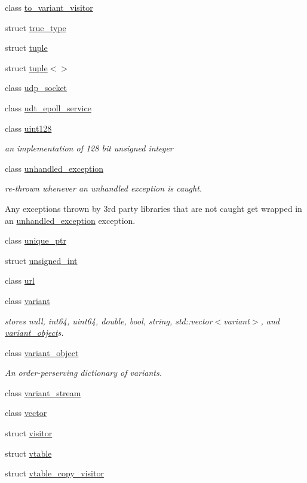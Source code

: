 \begin{DoxyCompactItemize}
\item 
class \mbox{\hyperlink{classfc_1_1to__variant__visitor}{to\+\_\+variant\+\_\+visitor}}
\item 
struct \mbox{\hyperlink{structfc_1_1true__type}{true\+\_\+type}}
\item 
struct \mbox{\hyperlink{structfc_1_1tuple}{tuple}}
\item 
struct \mbox{\hyperlink{structfc_1_1tuple_3_4}{tuple$<$$>$}}
\item 
class \mbox{\hyperlink{classfc_1_1udp__socket}{udp\+\_\+socket}}
\item 
class \mbox{\hyperlink{classfc_1_1udt__epoll__service}{udt\+\_\+epoll\+\_\+service}}
\item 
class \mbox{\hyperlink{classfc_1_1uint128}{uint128}}
\begin{DoxyCompactList}\small\item\em an implementation of 128 bit unsigned integer \end{DoxyCompactList}\item 
class \mbox{\hyperlink{classfc_1_1unhandled__exception}{unhandled\+\_\+exception}}
\begin{DoxyCompactList}\small\item\em re-\/thrown whenever an unhandled exception is caught.

Any exceptions thrown by 3rd party libraries that are not caught get wrapped in an \mbox{\hyperlink{classfc_1_1unhandled__exception}{unhandled\+\_\+exception}} exception. \end{DoxyCompactList}\item 
class \mbox{\hyperlink{classfc_1_1unique__ptr}{unique\+\_\+ptr}}
\item 
struct \mbox{\hyperlink{structfc_1_1unsigned__int}{unsigned\+\_\+int}}
\item 
class \mbox{\hyperlink{classfc_1_1url}{url}}
\item 
class \mbox{\hyperlink{classfc_1_1variant}{variant}}
\begin{DoxyCompactList}\small\item\em stores null, int64, uint64, double, bool, string, std\+::vector$<$variant$>$, and \mbox{\hyperlink{classfc_1_1variant__object}{variant\+\_\+object}}\textquotesingle{}s. \end{DoxyCompactList}\item 
class \mbox{\hyperlink{classfc_1_1variant__object}{variant\+\_\+object}}
\begin{DoxyCompactList}\small\item\em An order-\/perserving dictionary of variant\textquotesingle{}s. \end{DoxyCompactList}\item 
class \mbox{\hyperlink{classfc_1_1variant__stream}{variant\+\_\+stream}}
\item 
class \mbox{\hyperlink{classfc_1_1vector}{vector}}
\item 
struct \mbox{\hyperlink{structfc_1_1visitor}{visitor}}
\item 
struct \mbox{\hyperlink{structfc_1_1vtable}{vtable}}
\item 
struct \mbox{\hyperlink{structfc_1_1vtable__copy__visitor}{vtable\+\_\+copy\+\_\+visitor}}
\end{DoxyCompactItemize}
